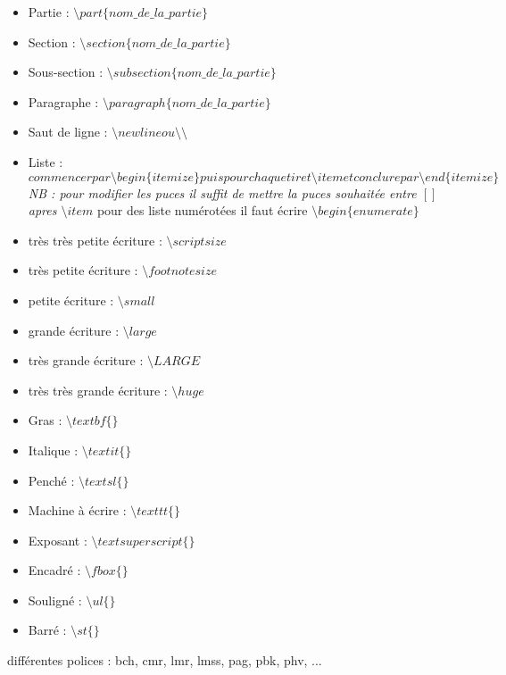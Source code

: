\begin{itemize}
\item Partie : $ \setminus part\lbrace \textit{nom\_ de\_ la\_ partie} \rbrace $ 

\item Section : $ \setminus section\lbrace \textit{nom\_ de\_ la\_ partie}\rbrace $ 

\item Sous-section : $ \setminus subsection\lbrace \textit{nom\_ de\_ la\_ partie} \rbrace $ 

\item Paragraphe : $ \setminus paragraph\lbrace \textit{nom\_ de\_ la\_ partie}\rbrace $

\item Saut de ligne : $ \setminus newline ou \setminus \setminus $ 

\item Liste : $ commencer par \setminus begin \lbrace itemize \rbrace puis pour chaque tiret \setminus item et conclure par \setminus end\lbrace itemize \rbrace $ \textit{ NB : pour modifier les puces il suffit de mettre la puces souhaitée entre $ [  ] $ apres $ \setminus item $} 
\newline pour des liste numérotées il faut écrire $\setminus begin\lbrace enumerate\rbrace $

\item très très petite écriture : $ \setminus scriptsize $

\item très petite écriture : $ \setminus footnotesize $

\item petite écriture : $ \setminus small $

\item grande écriture : $ \setminus large$ 

\item très grande écriture : $ \setminus LARGE $

\item très très grande écriture : $ \setminus huge $

\item Gras :  $ \setminus textbf\lbrace\rbrace $
\item Italique :  $ \setminus textit\lbrace\rbrace $
\item Penché :  $ \setminus textsl\lbrace\rbrace $
\item Machine à écrire :  $ \setminus texttt\lbrace\rbrace $
\item Exposant :  $ \setminus textsuperscript\lbrace\rbrace $
\item Encadré :  $ \setminus fbox\lbrace\rbrace $
\item Souligné :  $ \setminus ul\lbrace\rbrace $
\item Barré :  $ \setminus st\lbrace\rbrace $
\end{itemize}

différentes polices : bch, cmr, lmr, lmss, pag, pbk, phv, ...
